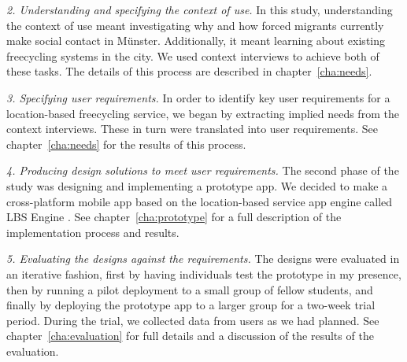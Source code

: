 \textit{2. Understanding and specifying the context of use.} In this study, understanding the context of use meant investigating why and how forced migrants currently make social contact in Münster. Additionally, it meant learning about existing freecycling systems in the city. We used context interviews to achieve both of these tasks. The details of this process are described in chapter~\ref{cha:needs}.

\textit{3. Specifying user requirements.} In order to identify key user requirements for a location-based freecycling service, we began by extracting implied needs from the context interviews. These in turn were translated into user requirements. See chapter~\ref{cha:needs} for the results of this process.

\textit{4. Producing design solutions to meet user requirements.} The second phase of the study was designing and implementing a prototype app. We decided to make a cross-platform mobile app based on the location-based service app engine called LBS Engine \cite{einfeldt_lbs_2018}. See chapter~\ref{cha:prototype} for a full description of the implementation process and results.

\textit{5. Evaluating the designs against the requirements.} The designs were evaluated in an iterative fashion, first by having individuals test the prototype in my presence, then by running a pilot deployment to a small group of fellow students, and finally by deploying the prototype app to a larger group for a two-week trial period. During the trial, we collected data from users as we had planned. See chapter~\ref{cha:evaluation} for full details and a discussion of the results of the evaluation.